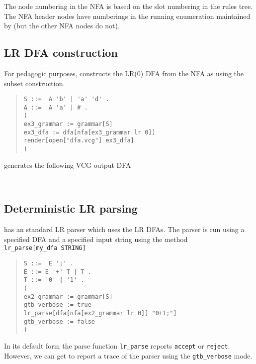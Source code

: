 The node numbering in the NFA is based on the slot numbering in the
rules tree. The NFA header nodes have numberings in the running
enumeration maintained by \gtb (but the other NFA nodes do not).


\subsection{LR DFA construction}

For pedagogic purposes, \gtb constructs the LR(0) DFA from the NFA as
using the subset construction. 

\begin{quote}
\begin{verbatim}
S ::=  A 'b' | 'a' 'd' .
A ::=  A 'a' | # .
(
ex3_grammar := grammar[S]
ex3_dfa := dfa[nfa[ex3_grammar lr 0]]
render[open["dfa.vcg"] ex3_dfa]
)
\end{verbatim}
\end{quote}
generates the following VCG output DFA
\begin{center}
\\[2mm]
\end{center}

\subsection{Deterministic LR parsing}

\gtb has an standard LR parser which uses the LR DFAs.
The parser is run using a specified DFA and a
specified input string using the method\\
\verb+lr_parse[my_dfa STRING]+


\begin{quote}
\begin{verbatim}
S ::=  E ';' .
E ::= E '+' T | T .
T ::= '0' | '1' .
(
ex2_grammar := grammar[S]
gtb_verbose := true
lr_parse[dfa[nfa[ex2_grammar lr 0]] "0+1;"]
gtb_verbose := false
)
\end{verbatim}
\end{quote}

In its default form the parse function \verb+lr_parse+
reports \verb+accept+ or
\verb+reject+. However, we can get \gtb to report a trace of the 
parser using the \verb+gtb_verbose+ mode. 

